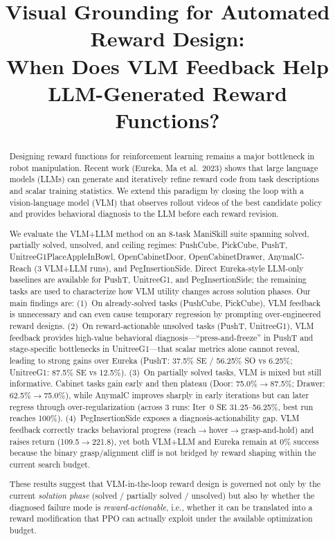 \documentclass[conference]{IEEEtran}
\begin{document}
\title{Visual Grounding for Automated Reward Design:\\
When Does VLM Feedback Help LLM-Generated Reward Functions?}

\author{}

\maketitle

\begin{abstract}
Designing reward functions for reinforcement learning remains a major bottleneck
in robot manipulation. Recent work (Eureka, Ma et al.\ 2023) shows that large
language models (LLMs) can generate and iteratively refine reward code from task
descriptions and scalar training statistics. We extend this paradigm by closing
the loop with a vision-language model (VLM) that observes rollout videos of the
best candidate policy and provides behavioral diagnosis to the LLM before each
reward revision.

We evaluate the VLM+LLM method on an 8-task ManiSkill suite spanning solved,
partially solved, unsolved, and ceiling regimes: PushCube, PickCube, PushT,
UnitreeG1PlaceAppleInBowl, OpenCabinetDoor, OpenCabinetDrawer,
AnymalC-Reach (3 VLM+LLM runs), and PegInsertionSide. Direct Eureka-style
LLM-only baselines are available for PushT, UnitreeG1, and PegInsertionSide;
the remaining tasks are used to characterize how VLM utility changes across
solution phases. Our main findings are:
(1)~On already-solved tasks (PushCube, PickCube), VLM feedback is unnecessary
and can even cause temporary regression by prompting over-engineered reward
designs.
(2)~On reward-actionable unsolved tasks (PushT, UnitreeG1), VLM feedback provides
high-value behavioral diagnosis---``press-and-freeze'' in PushT and
stage-specific bottlenecks in UnitreeG1---that scalar metrics alone cannot
reveal, leading to strong gains over Eureka (PushT: 37.5\% SE / 56.25\% SO vs
6.25\%; UnitreeG1: 87.5\% SE vs 12.5\%).
(3)~On partially solved tasks, VLM is mixed but still informative. Cabinet
tasks gain early and then plateau (Door: 75.0\%$\to$87.5\%; Drawer:
62.5\%$\to$75.0\%), while AnymalC improves sharply in early iterations but can
later regress through over-regularization (across 3 runs: Iter~0 SE
31.25--56.25\%, best run reaches 100\%).
(4)~PegInsertionSide exposes a diagnosis-actionability gap. VLM feedback
correctly tracks behavioral progress (reach$\to$hover$\to$grasp-and-hold) and
raises return (109.5$\to$221.8), yet both VLM+LLM and Eureka remain at 0\%
success because the binary grasp/alignment cliff is not bridged by reward
shaping within the current search budget.

These results suggest that VLM-in-the-loop reward design is governed not only
by the current \emph{solution phase} (solved / partially solved / unsolved) but
also by whether the diagnosed failure mode is \emph{reward-actionable}, i.e.,
whether it can be translated into a reward modification that PPO can actually
exploit under the available optimization budget.
\end{abstract}
\end{document}
